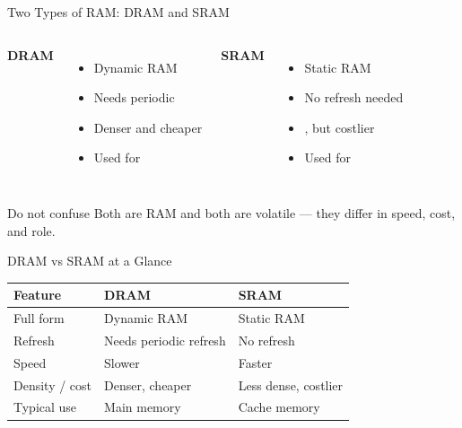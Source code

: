 \documentclass[aspectratio=169]{beamer}
\begin{document}
\begin{frame}{Two Types of RAM: DRAM and SRAM}
  \begin{columns}[T]
      \textbf{DRAM}
      \begin{itemize}
        \item Dynamic RAM
        \item Needs periodic 
        \item Denser and cheaper
        \item Used for 
      \end{itemize}
      \textbf{SRAM}
      \begin{itemize}
        \item Static RAM
        \item No refresh needed
        \item {}, but costlier
        \item Used for 
      \end{itemize}
  \end{columns}
  \vspace{0.2cm}
  \begin{alertblock}{Do not confuse}
    Both are RAM and both are volatile --- they differ in speed, cost, and role.
  \end{alertblock}
\end{frame}

\begin{frame}{DRAM vs SRAM at a Glance}
  \begin{center}
    \begin{tabular}{lll}
      \toprule
      \textbf{Feature} & \textbf{DRAM} & \textbf{SRAM} \\
      \midrule
      Full form & Dynamic RAM & Static RAM \\
      Refresh & Needs periodic refresh & No refresh \\
      Speed & Slower & Faster \\
      Density / cost & Denser, cheaper & Less dense, costlier \\
      Typical use & Main memory & Cache memory \\
      \bottomrule
    \end{tabular}
  \end{center}
  \vspace{0.3cm}
\end{frame}
\end{document}
